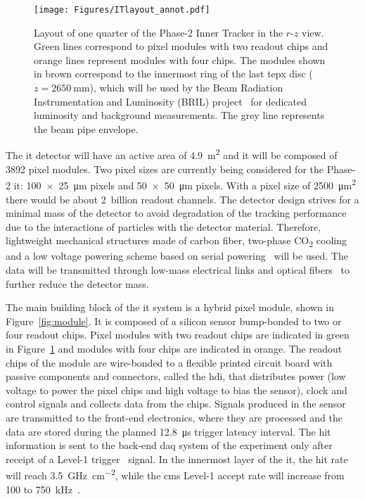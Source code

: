 \begin{figure}[t]
    \centering
    \texttt{[image: Figures/ITlayout\_annot.pdf]}
    \caption{Layout of one quarter of the Phase-2 Inner Tracker in the $r$-$z$ view. Green lines correspond to pixel modules with two readout chips and orange lines represent modules with four chips. The modules shown in brown correspond to the innermost ring of the last \gls{tepx} disc ($z=\SI{2650}{\milli\meter}$), which will be used by the Beam Radiation Instrumentation and Luminosity (BRIL) project~\citep{bril_cdr} for dedicated luminosity and background measurements. The grey line represents the beam pipe envelope.}
    \label{fig:itlayout}
\end{figure}

The \gls{it} detector will have an active area of \SI{4.9}{\meter\squared} and it will be composed of \num{3892} pixel modules. Two pixel sizes are currently being considered for the Phase-2 \gls{it}: \SI[product-units = power]{100x25}{\micro\meter} pixels and \SI[product-units = power]{50x50}{\micro\meter} pixels. With a pixel size of \SI{2500}{\micro\meter\squared} there would be about \num{2}~billion readout channels. The detector design strives for a minimal mass of the detector to avoid degradation of the tracking performance due to the interactions of particles with the detector material. Therefore, lightweight mechanical structures made of carbon fiber, two-phase CO\textsubscript{2} cooling~\citep{p2_tdr} and a low voltage powering scheme based on serial powering~\citep{sp_vertex19} will be used. The data will be transmitted through low-mass electrical links and optical fibers~\citep{p2_tdr} to further reduce the detector mass.

The main building block of the \gls{it} system is a hybrid pixel module, shown in Figure~\ref{fig:module}. It is composed of a silicon sensor bump-bonded to two or four readout chips. Pixel modules with two readout chips are indicated in green in Figure~\ref{fig:itlayout} and modules with four chips are indicated in orange.
The readout chips of the module are wire-bonded to a flexible printed circuit board with passive components and connectors, called the \acrlong{hdi}, that distributes power (low voltage to power the pixel chips and high voltage to bias the sensor), clock and control signals and collects data from the chips. Signals produced in the sensor are transmitted to the front-end electronics, where they are processed and the data are stored during the planned \SI{12.8}{\micro\second} trigger latency interval. The hit information is sent to the back-end \acrlong{daq} system of the experiment only after receipt of a Level-1 trigger~\citep{L1_trigger} signal. In the innermost layer of the \gls{it}, the hit rate will reach \SI{3.5}{\giga\hertz\per\centi\meter\squared}, while the \gls{cms} Level-1 accept rate will increase from \num{100} to \SI{750}{kHz}~\citep{L1_trigger}.

